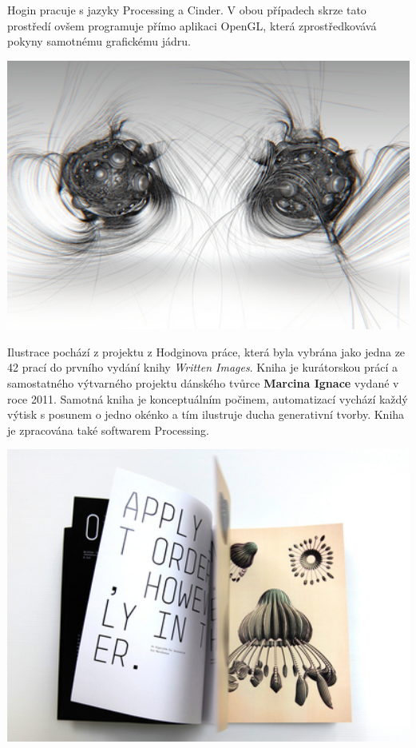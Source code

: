 \documentclass[10pt]{book}
\begin{document}
Hogin pracuje s jazyky Processing a Cinder. V obou případech skrze tato prostředí ovšem programuje přímo aplikaci OpenGL, která zprostředkovává pokyny samotnému grafickému jádru.


\includegraphics[width = 1\textwidth]{imgs/writtenimages.jpg}

Ilustrace pochází z projektu z Hodginova práce, která byla vybrána jako jedna ze 42 prací do prvního vydání knihy {\em Written Images}. Kniha je kurátorskou prácí a samostatného výtvarného projektu dánského tvůrce \textbf{Marcina Ignace} vydané v roce 2011. Samotná kniha je konceptuálním počinem, automatizací vychází každý výtisk s posunem o jedno okénko a tím ilustruje ducha generativní tvorby. Kniha je zpracována také softwarem Processing.



\includegraphics[width = 1\textwidth]{imgs/writtenimages.png}
\end{document}
